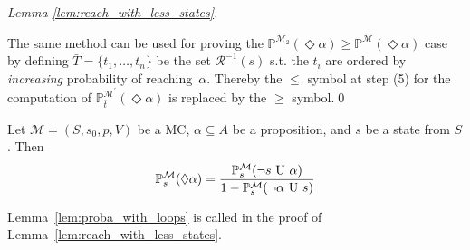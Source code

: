 \documentclass{llncs}
\newcommand{\mc}{\textnormal{MC}}
\newcommand{\Proba}            {\ensuremath{\mathbb{P}}}
\newcommand{\ltlUntil}{\textnormal{ U }}
\newcommand{\ltlExists}{\ensuremath{\Diamond}}
\begin{document}
\begin{proof}[Lemma \ref{lem:reach_with_less_states}]
\begin{enumerate}
	
	\end{enumerate}
	
	The same method can be used for proving the $\Proba^{\mathcal{M}_2}(\ltlExists \alpha) \geq \Proba^{\mathcal{M}}(\ltlExists \alpha)$ case
	by defining $\bar{T} = \{t_1, \ldots, t_n\}$ be the set $\mathcal{R}^{-1}(s)$ s.t.
	the $t_i$ are ordered by {\em increasing} probability of reaching~$\alpha$.
	Thereby the $\leq$ symbol at step (5) for the computation of $\Proba^{\mathcal{M}^{\prime}}_{\bar{t}}(\ltlExists \alpha)$
	is replaced by the $\geq$ symbol.\qed
\end{proof}

\begin{lemma}\label{lem:proba_with_loops}
	Let $\mathcal{M} = (S, s_0 , p, V)$ be a {\mc},
	$\alpha \subseteq A$ be a proposition,
	and $s$ be a state from $S$.
    Then
    $$\Proba^\mathcal{M}_s(\ltlExists \alpha) =
    \frac{
    	\Proba^\mathcal{M}_s(\neg s \ltlUntil \alpha)}{
    	1 - \Proba^\mathcal{M}_s(\neg\alpha \ltlUntil s)}$$
\end{lemma}

Lemma~\ref{lem:proba_with_loops} is called in the proof of Lemma~\ref{lem:reach_with_less_states}.
\end{document}
